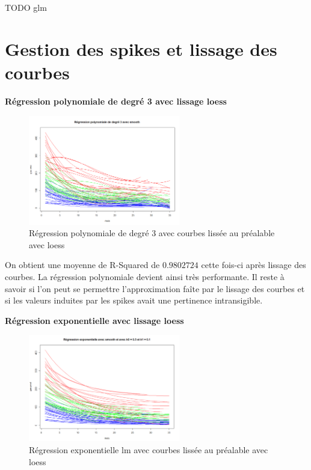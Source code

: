 \documentclass[12pt]{article}
\begin{document}
TODO glm


\newpage

\section{Gestion des spikes et lissage des courbes}

\textbf{R\'egression polynomiale de degr\'e 3 avec lissage loess}

\begin{figure}[H]
 \centering %
	\includegraphics[width=250px]{reg_pol3_smooth_loess}
  \caption{\label{fig:reg_pol3_smooth_loess} R\'egression polynomiale de degr\'e 3 avec courbes liss\'ee au pr\'ealable avec loess}
\end{figure}

On obtient une moyenne de R-Squared de $0.9802724$ cette fois-ci apr\`es lissage des courbes. La r\'egression polynomiale devient ainsi tr\`es performante. Il reste \`a savoir si l'on peut se permettre l'approximation fa\^ite par le lissage des courbes et si les valeurs induites par les spikes avait une pertinence intransigible.

\textbf{R\'egression exponentielle avec lissage loess}

\begin{figure}[H]
 \centering %
	\includegraphics[width=250px]{reg_exp_smooth_loess}
  \caption{\label{fig:reg_exp_smooth_loess} R\'egression exponentielle lm avec courbes liss\'ee au pr\'ealable avec loess}
\end{figure}
\end{document}
